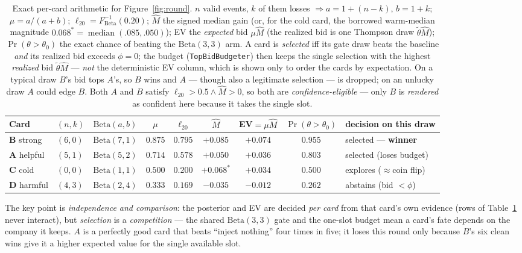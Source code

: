 \documentclass[11pt]{article}
\newcommand{\code}[1]{\texttt{\small #1}}
\newcommand{\Beta}{\mathrm{Beta}}
\begin{document}
\begin{table}[H]
\centering
\footnotesize
\begin{tabular}{@{}llcccccc l@{}}
\toprule
Card & $(n,k)$ & $\Beta(a,b)$ & $\mu$ & $\ell_{20}$ & $\hat M$ & EV${=}\mu\hat M$ & $\Pr(\theta{>}\theta_0)$ & decision on this draw \\
\midrule
\textbf{B} strong  & $(6,0)$ & $\Beta(7,1)$ & $0.875$ & $0.795$ & $+0.085$ & $+0.074$ & $0.955$ & selected --- \textbf{winner} \\
\textbf{A} helpful & $(5,1)$ & $\Beta(5,2)$ & $0.714$ & $0.578$ & $+0.050$ & $+0.036$ & $0.803$ & selected (loses budget) \\
\textbf{C} cold    & $(0,0)$ & $\Beta(1,1)$ & $0.500$ & $0.200$ & $+0.068^{*}$ & $+0.034$ & $0.500$ & explores ($\approx$coin flip) \\
\textbf{D} harmful & $(4,3)$ & $\Beta(2,4)$ & $0.333$ & $0.169$ & $-0.035$ & $-0.012$ & $0.262$ & abstains (bid $<\phi$) \\
\bottomrule
\end{tabular}
\caption{Exact per-card arithmetic for Figure~\ref{fig:round}. $n$ valid events,
$k$ of them losses $\Rightarrow a{=}1{+}(n{-}k),\,b{=}1{+}k$; $\mu{=}a/(a{+}b)$;
$\ell_{20}{=}F^{-1}_{\Beta}(0.20)$; $\hat M$ the signed median gain (or, for the
cold card, the borrowed warm-median magnitude
$0.068^{*}{=}\operatorname{median}(.085,.050)$); EV the \emph{expected} bid
$\mu\hat M$ (the realized
bid is one Thompson draw $\tilde\theta\hat M$); $\Pr(\theta{>}\theta_0)$ the exact
chance of beating the $\Beta(3,3)$ arm. A card is \emph{selected} iff its gate draw
beats the baseline \emph{and} its realized bid exceeds $\phi{=}0$; the budget
(\code{TopBidBudgeter}) then keeps the single selection with the highest
\emph{realized} bid $\tilde\theta\hat M$ --- \emph{not} the deterministic EV column,
which is shown only to order the cards by expectation. On a typical draw $B$'s bid
tops $A$'s, so $B$ wins and $A$ --- though also a legitimate selection --- is dropped;
on an unlucky draw $A$ could edge $B$. Both $A$ and $B$ satisfy
$\ell_{20}{>}0.5\wedge\hat M{>}0$, so both are \emph{confidence-eligible} --- only $B$
is \emph{rendered} as confident here because it takes the single slot.}
\label{tab:round}
\end{table}

The key point is \emph{independence and comparison}: the posterior and EV are
decided \emph{per card} from that card's own evidence (rows of Table~\ref{tab:round}
never interact), but \emph{selection} is a \emph{competition} --- the shared
$\Beta(3,3)$ gate and the one-slot budget mean a card's fate depends on the company
it keeps. $A$ is a perfectly good card that beats ``inject nothing'' four times in
five; it loses this round only because $B$'s six clean wins give it a higher
expected value for the single available slot.
\end{document}
